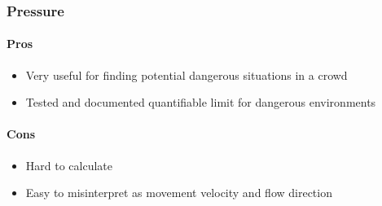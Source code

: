 \subsubsection{Pressure}


\paragraph{Pros}
\begin{itemize}
    \item Very useful for finding potential dangerous situations in a crowd
    \item Tested and documented quantifiable limit for dangerous environments
\end{itemize}

\paragraph{Cons}
\begin{itemize}
    \item Hard to calculate
    \item Easy to misinterpret as movement velocity and flow direction
\end{itemize}